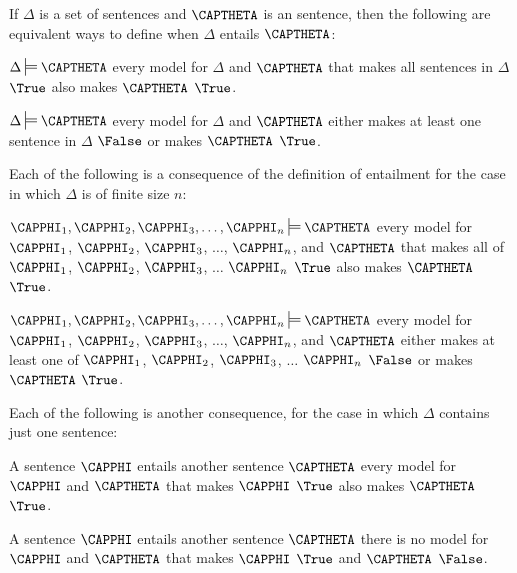 \begin{majorILnc}{}
	If $\Delta$ is a set of \GSL{} sentences and $\CAPTHETA$ is an \GSL{} sentence, then the following are equivalent ways to define when $\Delta$ entails $\CAPTHETA$:
	\begin{cenumerate}
		\item $\Delta\sdtstile{}{}\CAPTHETA$ \Iff every model for $\Delta$ and $\CAPTHETA$ that makes all sentences in $\Delta$ $\True$ also makes $\CAPTHETA$ $\True$.
		\item $\Delta\sdtstile{}{}\CAPTHETA$ \Iff every model for $\Delta$ and $\CAPTHETA$ either makes at least one sentence in $\Delta$ $\False$ or makes $\CAPTHETA$ $\True$.
	\end{cenumerate}
\end{majorILnc}

\noindent{}Each of the following is a consequence of the definition of entailment for the case in which $\Delta$ is of finite size $n$:

\begin{cenumerate}
		\item $\CAPPHI_1,\CAPPHI_2,\CAPPHI_3,\ldots,\CAPPHI_{\integer{n}}\sdtstile{}{}\CAPTHETA$ \Iff every model for $\CAPPHI_1$, $\CAPPHI_2$, $\CAPPHI_3$, $\ldots$, $\CAPPHI_{\integer{n}}$, and $\CAPTHETA$ that makes all of $\CAPPHI_1$, $\CAPPHI_2$, $\CAPPHI_3$, $\ldots$ $\CAPPHI_{\integer{n}}$ $\True$ also makes $\CAPTHETA$ $\True$.
		\item $\CAPPHI_1,\CAPPHI_2,\CAPPHI_3,\ldots,\CAPPHI_{\integer{n}}\sdtstile{}{}\CAPTHETA$ \Iff every model for $\CAPPHI_1$, $\CAPPHI_2$, $\CAPPHI_3$, $\ldots$, $\CAPPHI_{\integer{n}}$, and $\CAPTHETA$ either makes at least one of $\CAPPHI_1$, $\CAPPHI_2$, $\CAPPHI_3$, $\ldots$ $\CAPPHI_{\integer{n}}$ $\False$ or makes $\CAPTHETA$ $\True$.
\end{cenumerate}

\noindent{}Each of the following is another consequence, for the case in which $\Delta$ contains just one sentence:

\begin{cenumerate}
\item A sentence $\CAPPHI$ {entails} another sentence $\CAPTHETA$ \Iff every model for $\CAPPHI$ and $\CAPTHETA$ that makes $\CAPPHI$ $\True$ also makes $\CAPTHETA$ $\True$.
\item A sentence $\CAPPHI$ {entails} another sentence $\CAPTHETA$ \Iff there is no model for $\CAPPHI$ and $\CAPTHETA$ that makes $\CAPPHI$ $\True$ and $\CAPTHETA$ $\False$.
\end{cenumerate}

